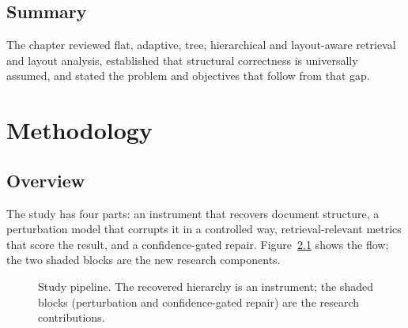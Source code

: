 \documentclass[12pt,a4paper]{report}
\begin{document}
\section{Summary}
The chapter reviewed flat, adaptive, tree, hierarchical and layout-aware retrieval and layout
analysis, established that structural correctness is universally assumed, and stated the problem and
objectives that follow from that gap.

\chapter{Methodology}

\section{Overview}
The study has four parts: an instrument that recovers document structure, a perturbation model that
corrupts it in a controlled way, retrieval-relevant metrics that score the result, and a
confidence-gated repair. Figure~\ref{fig:pipe} shows the flow; the two shaded blocks are the new
research components.

\begin{figure}[!htbp]\centering
{}
\caption{Study pipeline. The recovered hierarchy is an instrument; the shaded blocks (perturbation
and confidence-gated repair) are the research contributions.}
\label{fig:pipe}
\end{figure}
\end{document}
